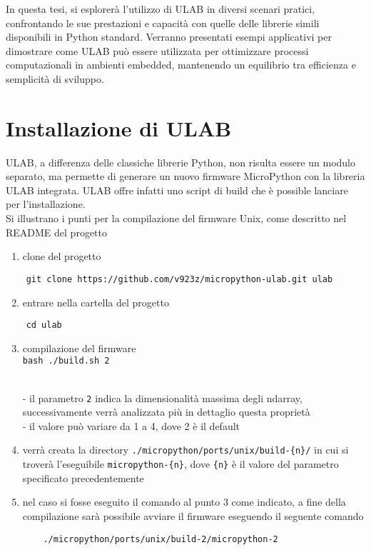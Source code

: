 \documentclass[12pt,a4paper]{report}
\begin{document}
In questa tesi, si esplorerà l'utilizzo di ULAB in
diversi scenari pratici, confrontando le sue prestazioni e capacità con
quelle delle librerie simili disponibili in Python standard. Verranno
presentati esempi applicativi per dimostrare come ULAB può essere
utilizzata per ottimizzare processi computazionali in ambienti embedded,
mantenendo un equilibrio tra efficienza e semplicità di sviluppo.

\section{Installazione di ULAB}\label{installazione-di-ulab}

ULAB, a differenza delle classiche librerie Python, non risulta essere
un modulo separato, ma permette di generare un nuovo firmware
MicroPython con la libreria ULAB integrata. ULAB offre infatti uno
script di build che è possible lanciare per
l'installazione.\\
Si illustrano i punti per la compilazione del firmware Unix, come
descritto nel README del progetto \cite{ulab_compiling}

\begin{enumerate}
\item
  clone del progetto
\end{enumerate}

\begin{verbatim}
    git clone https://github.com/v923z/micropython-ulab.git ulab
\end{verbatim}

\begin{enumerate}
\setcounter{enumi}{1}
\item
  entrare nella cartella del progetto
\end{enumerate}
\begin{verbatim}
    cd ulab
\end{verbatim}

\begin{enumerate}
\setcounter{enumi}{2}
\item
  compilazione del firmware\\
  \texttt{bash\ ./build.sh\ 2\ }\strut \\
  - il parametro \texttt{2} indica la dimensionalità massima degli
  ndarray, successivamente verrà analizzata più in dettaglio questa
  proprietà\\
  - il valore può variare da 1 a 4, dove 2 è il default
\item
  verrà creata la directory
  \texttt{./micropython/ports/unix/build-\{n\}/} in cui si troverà
  l'eseguibile \texttt{micropython-\{n\}}, dove
  \texttt{\{n\}} è il valore del parametro specificato precedentemente
\item
  nel caso si fosse eseguito il comando al punto 3 come indicato, a fine
  della compilazione sarà possibile avviare il firmware eseguendo il
  seguente comando
\begin{verbatim}
    ./micropython/ports/unix/build-2/micropython-2
\end{verbatim}
\end{enumerate}
\end{document}
